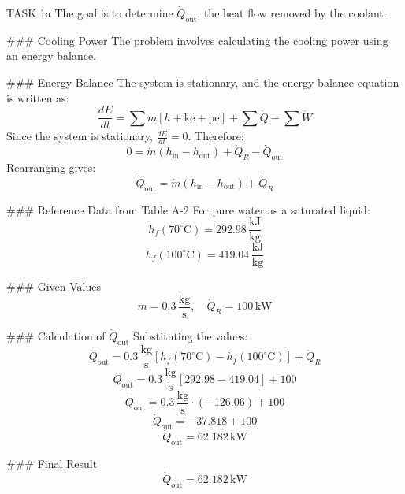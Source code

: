 TASK 1a  
The goal is to determine \( \dot{Q}_{\text{out}} \), the heat flow removed by the coolant.

### Cooling Power  
The problem involves calculating the cooling power using an energy balance.

### Energy Balance  
The system is stationary, and the energy balance equation is written as:  
\[
\frac{dE}{dt} = \sum \dot{m} \left[ h + \text{ke} + \text{pe} \right] + \sum \dot{Q} - \sum \dot{W}
\]  
Since the system is stationary, \( \frac{dE}{dt} = 0 \). Therefore:  
\[
0 = \dot{m} \left( h_{\text{in}} - h_{\text{out}} \right) + \dot{Q}_R - \dot{Q}_{\text{out}}
\]  
Rearranging gives:  
\[
\dot{Q}_{\text{out}} = \dot{m} \left( h_{\text{in}} - h_{\text{out}} \right) + \dot{Q}_R
\]

### Reference Data from Table A-2  
For pure water as a saturated liquid:  
\[
h_f(70^\circ\text{C}) = 292.98 \, \frac{\text{kJ}}{\text{kg}}
\]  
\[
h_f(100^\circ\text{C}) = 419.04 \, \frac{\text{kJ}}{\text{kg}}
\]  

### Given Values  
\[
\dot{m} = 0.3 \, \frac{\text{kg}}{\text{s}}, \quad \dot{Q}_R = 100 \, \text{kW}
\]

### Calculation of \( \dot{Q}_{\text{out}} \)  
Substituting the values:  
\[
\dot{Q}_{\text{out}} = 0.3 \, \frac{\text{kg}}{\text{s}} \left[ h_f(70^\circ\text{C}) - h_f(100^\circ\text{C}) \right] + \dot{Q}_R
\]  
\[
\dot{Q}_{\text{out}} = 0.3 \, \frac{\text{kg}}{\text{s}} \left[ 292.98 - 419.04 \right] + 100
\]  
\[
\dot{Q}_{\text{out}} = 0.3 \, \frac{\text{kg}}{\text{s}} \cdot (-126.06) + 100
\]  
\[
\dot{Q}_{\text{out}} = -37.818 + 100
\]  
\[
\dot{Q}_{\text{out}} = 62.182 \, \text{kW}
\]

### Final Result  
\[
\dot{Q}_{\text{out}} = 62.182 \, \text{kW}
\]